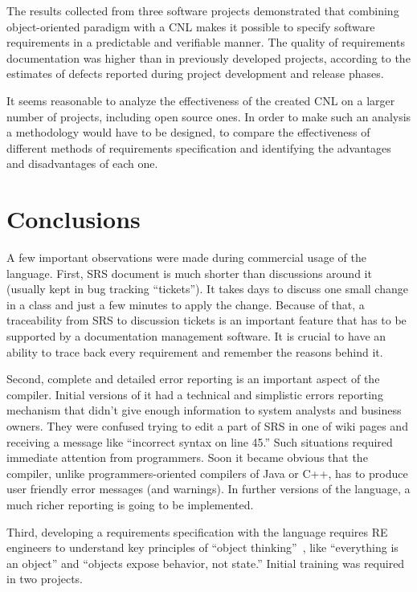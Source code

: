 \documentclass[conference]{IEEEtran}
\begin{document}
The results collected from three software projects demonstrated that
combining object-oriented paradigm with a CNL makes it possible to
specify software requirements in a predictable and verifiable manner. The
quality of requirements documentation was higher than in previously
developed projects, according to the estimates of defects reported during
project development and release phases.

It seems reasonable to analyze the effectiveness of the created CNL on
a larger number of projects, including open source ones. In order to make
such an analysis a methodology would have to be designed, to compare
the effectiveness of different methods of requirements specification
and identifying the advantages and disadvantages of each one.

\section{Conclusions}
\label{sec:conclusion}

A few important observations were made during commercial usage of the language.
First, SRS document is much shorter than discussions around it (usually kept
in bug tracking ``tickets''). It takes days to discuss one small change in a
class and just a few minutes to apply the change. Because of that, a
traceability from SRS to discussion tickets is an important feature that
has to be supported by a documentation management software. It is crucial
to have an ability to trace back every requirement and remember
the reasons behind it.

Second, complete and detailed error reporting is an important aspect of
the compiler. Initial versions of it had a technical and simplistic
errors reporting mechanism that didn't give enough information to system
analysts and business owners. They were confused trying to edit a part of
SRS in one of wiki pages and receiving a message like ``incorrect syntax on
line 45.'' Such situations required immediate attention from
programmers. Soon it became obvious that the compiler, unlike
programmers-oriented compilers of Java or C++, has to produce user friendly
error messages (and warnings). In further versions of the language, a much richer
reporting is going to be implemented.

Third, developing a requirements specification with the language requires RE
engineers to understand key principles of ``object thinking''~\cite{west04},
like ``everything is an object'' and ``objects expose behavior, not state.''
Initial training was required in two projects.



\end{document}
